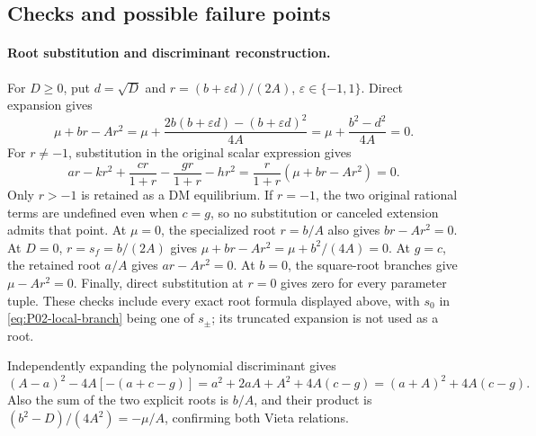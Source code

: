 \documentclass[11pt]{article}
\theoremstyle{definition}
\theoremstyle{remark}
\begin{document}
\subsection{Checks and possible failure points}
\label{subsec:P02-checks}

\paragraph{Root substitution and discriminant reconstruction.}
For $D\ge0$, put $d=\sqrt D$ and
$r=(b+\varepsilon d)/(2A)$, $\varepsilon\in\{-1,1\}$.
Direct expansion gives
\[
 \mu+br-Ar^2
 =\mu+\frac{2b(b+\varepsilon d)-(b+\varepsilon d)^2}{4A}
 =\mu+\frac{b^2-d^2}{4A}=0.
\]
For $r\ne-1$, substitution in the original scalar expression gives
\[
 ar-kr^2+\frac{cr}{1+r}-\frac{gr}{1+r}-hr^2
   =\frac{r}{1+r}(\mu+br-Ar^2)=0.
\]
Only $r>-1$ is retained as a DM equilibrium. If $r=-1$, the two
original rational terms are undefined even when $c=g$, so no
substitution or canceled extension admits that point.
At $\mu=0$, the specialized root $r=b/A$ also gives
$br-Ar^2=0$. At $D=0$, $r=s_f=b/(2A)$ gives
$\mu+br-Ar^2=\mu+b^2/(4A)=0$. At $g=c$, the retained root
$a/A$ gives $ar-Ar^2=0$. At $b=0$, the square-root branches give
$\mu-Ar^2=0$. Finally, direct substitution at $r=0$ gives zero
for every parameter tuple. These checks include every exact root
formula displayed above, with $s_0$ in \eqref{eq:P02-local-branch}
being one of $s_\pm$; its truncated expansion is not used as a root.

Independently expanding the polynomial discriminant gives
\[
 (A-a)^2-4A[-(a+c-g)]
 =a^2+2aA+A^2+4A(c-g)
 =(a+A)^2+4A(c-g).
\]
Also the sum of the two explicit roots is $b/A$, and their product
is $(b^2-D)/(4A^2)=-\mu/A$, confirming both Vieta relations.
\end{document}
